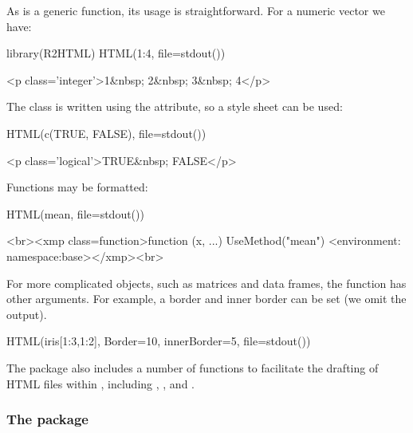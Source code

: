 As  is a generic function, its usage is straightforward. For a
numeric vector we have:
\begin{Schunk}
\begin{Sinput}
 library(R2HTML)
 HTML(1:4, file=stdout())
\end{Sinput}
\begin{Soutput}
<p class='integer'>1&nbsp; 2&nbsp; 3&nbsp; 4</p>
\end{Soutput}
\end{Schunk}
The class is written using the  attribute, so a style
sheet can be used:
\begin{Schunk}
\begin{Sinput}
 HTML(c(TRUE, FALSE), file=stdout())
\end{Sinput}
\begin{Soutput}
<p class='logical'>TRUE&nbsp; FALSE</p>
\end{Soutput}
\end{Schunk}

Functions may be formatted:
\begin{Schunk}
\begin{Sinput}
 HTML(mean, file=stdout())
\end{Sinput}
\begin{Soutput}
<br><xmp class=function>function (x, ...) 
UseMethod("mean")
<environment: namespace:base></xmp><br>
\end{Soutput}
\end{Schunk}

For more complicated objects, such as matrices and data frames, the
 function has other arguments. For example, a border
and inner border can be set (we omit the output).
\begin{Schunk}
\begin{Sinput}
 HTML(iris[1:3,1:2], Border=10, innerBorder=5, file=stdout())
\end{Sinput}
\end{Schunk}

The package also includes a number of functions to facilitate the
drafting of HTML files within \R, including ,
,  and
.


\subsubsection{The  package}
\label{sec:pkgbrew-package}

